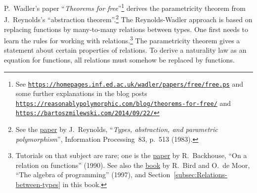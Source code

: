 P.~Wadler\textsf{'}s paper \textsf{``}\emph{Theorems for free}\textsf{''}\footnote{See \texttt{\href{https://homepages.inf.ed.ac.uk/wadler/papers/free/free.ps}{https://homepages.inf.ed.ac.uk/wadler/papers/free/free.ps}}
and some further explanations in the blog posts \texttt{\href{https://reasonablypolymorphic.com/blog/theorems-for-free/}{https://reasonablypolymorphic.com/blog/theorems-for-free/}}
and \texttt{\href{https://bartoszmilewski.com/2014/09/22/}{https://bartoszmilewski.com/2014/09/22/}}} derives the parametricity theorem from J.~Reynolds\textsf{'}s \textsf{``}abstraction
theorem\textsf{''}.\footnote{See the \href{https://people.mpi-sws.org/~dreyer/tor/papers/reynolds.pdf}{paper}
by J.~Reynolds, \textsf{``}\emph{Types, abstraction, and parametric polymorphism}\textsf{''},
Information Processing~83, p.~513 (1983).} The Reynolds-Wadler approach is based on replacing functions by many-to-many
relations between types. One first needs to learn the rules for working
with relations.\footnote{Tutorials on that subject are rare; one is the \href{https://www.researchgate.net/publication/262348393_On_a_Relation_on_Functions}{paper}
by R.~Backhouse, \textsf{``}On a relation on functions\textsf{''}
(1990). See also the \href{https://themattchan.com/docs/algprog.pdf}{book}
by R.~Bird and O.~de Moor, \textsf{``}The algebra of
programming\textsf{''} (1997), and Section~\ref{subsec:Relations-between-types}
in this book.} The parametricity theorem gives a statement about certain properties
of relations. To derive a naturality law as an equation for functions,
all relations must somehow be replaced by functions. 

